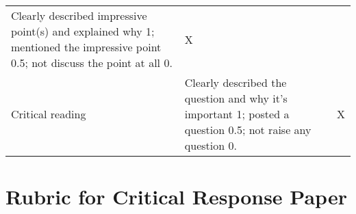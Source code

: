 \documentclass[11pt,]{article}
\theoremstyle{definition}
\theoremstyle{definition}
\theoremstyle{remark}
\begin{document}
\begin{longtable}[]{@{}lll@{}}
\begin{minipage}[t]{0.72\columnwidth}
Clearly described impressive point(s) and explained why 1; mentioned the
impressive point 0.5; not discuss the point at all 0.\strut
\end{minipage} & \begin{minipage}[t]{0.04\columnwidth}\raggedright\strut
X\strut
\end{minipage}\tabularnewline
\begin{minipage}[t]{0.16\columnwidth}\raggedright\strut
Critical reading\strut
\end{minipage} & \begin{minipage}[t]{0.72\columnwidth}\raggedright\strut
Clearly described the question and why it's important 1; posted a
question 0.5; not raise any question 0.\strut
\end{minipage} & \begin{minipage}[t]{0.04\columnwidth}\raggedright\strut
X\strut
\end{minipage}\tabularnewline
\bottomrule
\end{longtable}

\hypertarget{id}{\section{Rubric for Critical Response Paper}\label{id}}
\end{document}
